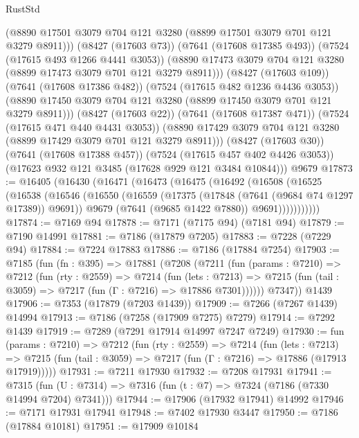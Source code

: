 \begin{lexlean}{RustStd}
\begin{coremodule}
              (@8890 @17501 @3079 @704 @121 @3280 (@8899 @17501 @3079 @701 @121 @3279 @8911)))
            (@8427 (@17603 @73))
            (@7641 (@17608 @17385 @493))
            (@7524 (@17615 @493 @1266 @4441 @3053))
            (@8890 @17473 @3079 @704 @121 @3280 (@8899 @17473 @3079 @701 @121 @3279 @8911)))
          (@8427 (@17603 @109))
          (@7641 (@17608 @17386 @482))
          (@7524 (@17615 @482 @1236 @4436 @3053))
          (@8890 @17450 @3079 @704 @121 @3280 (@8899 @17450 @3079 @701 @121 @3279 @8911)))
        (@8427 (@17603 @22))
        (@7641 (@17608 @17387 @471))
        (@7524 (@17615 @471 @440 @4431 @3053))
        (@8890 @17429 @3079 @704 @121 @3280 (@8899 @17429 @3079 @701 @121 @3279 @8911)))
      (@8427 (@17603 @30))
      (@7641 (@17608 @17388 @457))
      (@7524 (@17615 @457 @402 @4426 @3053))
      (@17623 @932 @121 @3485 (@17628 @929 @121 @3484 @10844)))
    @9679
@17873 := @16405
    (@16430
      (@16471
        (@16473
          (@16475
            (@16492
              (@16508
                (@16525
                  (@16538
                    (@16546
                      (@16550
                        (@16559
                          (@17375 (@17848 (@7641 (@9684 @74 @1297 @17389)) @9691))
                          @9679
                          (@7641 (@9685 @1422 @7880))
                          @9691)))))))))))
@17874 := @7169 @94
@17878 := @7171 (@7175 @94) (@7181 @94)
@17879 := @7190 @14991
@17881 := @7186 (@17879 @7205)
@17883 := @7228 (@7229 @94)
@17884 := @7224 @17883
@17886 := @7186 (@17884 @7254)
@17903 := @7185
    (fun (fn : @395) =>
    @17881
      (@7208
        (@7211
          (fun (params : @7210) =>
          @7212
            (fun (rty : @2559) =>
            @7214
              (fun (lets : @7213) =>
              @7215 (fun (tail : @3059) => @7217 (fun (Γ : @7216) => @17886 @7301))))))
        @7347))
    @1439
@17906 := @7353 (@17879 (@7203 @1439))
@17909 := @7266 (@7267 @1439) @14994
@17913 := @7186 (@7258 (@17909 @7275) @7279)
@17914 := @7292 @1439
@17919 := @7289 (@7291 @17914 @14997 @7247 @7249)
@17930 := fun (params : @7210) =>
  @7212
    (fun (rty : @2559) =>
    @7214
      (fun (lets : @7213) =>
      @7215 (fun (tail : @3059) => @7217 (fun (Γ : @7216) => @17886 (@17913 @17919)))))
@17931 := @7211 @17930
@17932 := @7208 @17931
@17941 := @7315
    (fun (U : @7314) => @7316 (fun (t : @7) => @7324 (@7186 (@7330 @14994 @7204) @7341)))
@17944 := @17906 (@17932 @17941) @14992
@17946 := @7171 @17931 @17941
@17948 := @7402 @17930 @3447
@17950 := @7186 (@17884 @10181)
@17951 := @17909 @10184

\end{coremodule}
\end{lexlean}
